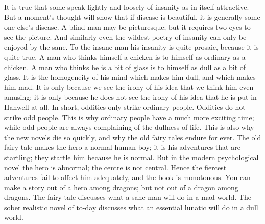 \documentclass{book}
\begin{document}
It is true that some speak lightly and loosely of insanity as in itself attractive. But a moment’s thought will show that if disease is beautiful, it is generally some one else’s disease. A blind man may be picturesque; but it requires two eyes to see the picture. And similarly even the wildest poetry of insanity can only be enjoyed by the sane. To the insane man his insanity is quite prosaic, because it is quite true. A man who thinks himself a chicken is to himself as ordinary as a chicken. A man who thinks he is a bit of glass is to himself as dull as a bit of glass. It is the homogeneity of his mind which makes him dull, and which makes him mad. It is only because we see the irony of his idea that we think him even amusing; it is only because he does not see the irony of his idea that he is put in Hanwell at all. In short, oddities only strike ordinary people. Oddities do not strike odd people. This is why ordinary people have a much more exciting time; while odd people are always complaining of the dullness of life. This is also why the new novels die so quickly, and why the old fairy tales endure for ever. The old fairy tale makes the hero a normal human boy; it is his adventures that are startling; they startle him because he is normal. But in the modern psychological novel the hero is abnormal; the centre is not central. Hence the fiercest adventures fail to affect him adequately, and the book is monotonous. You can make a story out of a hero among dragons; but not out of a dragon among dragons. The fairy tale discusses what a sane man will do in a mad world. The sober realistic novel of to-day discusses what an essential lunatic will do in a dull world.
\end{document}
